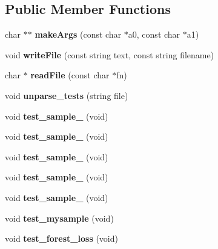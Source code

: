 \subsection*{Public Member Functions}
\begin{DoxyCompactItemize}
\item 
\hypertarget{classAstTestSuite_a2f0462e7a965acda10e09e70432cab40}{char $\ast$$\ast$ {\bfseries make\-Args} (const char $\ast$a0, const char $\ast$a1)}\label{classAstTestSuite_a2f0462e7a965acda10e09e70432cab40}

\item 
\hypertarget{classAstTestSuite_ab935b3c95647b24b5f250b7e3332a313}{void {\bfseries write\-File} (const string text, const string filename)}\label{classAstTestSuite_ab935b3c95647b24b5f250b7e3332a313}

\item 
\hypertarget{classAstTestSuite_afb1462e2494b011f0e5077a567e0ba3d}{char $\ast$ {\bfseries read\-File} (const char $\ast$fn)}\label{classAstTestSuite_afb1462e2494b011f0e5077a567e0ba3d}

\item 
\hypertarget{classAstTestSuite_a1fb6dcbf82548632381eb89079b456aa}{void {\bfseries unparse\-\_\-tests} (string file)}\label{classAstTestSuite_a1fb6dcbf82548632381eb89079b456aa}

\item 
\hypertarget{classAstTestSuite_ade48304a65cbc7449bd22ec9097b6a8c}{void {\bfseries test\-\_\-sample\-\_} (void)}\label{classAstTestSuite_ade48304a65cbc7449bd22ec9097b6a8c}

\item 
\hypertarget{classAstTestSuite_af764267aa9a94610fd5307ae81107312}{void {\bfseries test\-\_\-sample\-\_} (void)}\label{classAstTestSuite_af764267aa9a94610fd5307ae81107312}

\item 
\hypertarget{classAstTestSuite_a956750fe55d2eb218eb75bd7dc75bc34}{void {\bfseries test\-\_\-sample\-\_} (void)}\label{classAstTestSuite_a956750fe55d2eb218eb75bd7dc75bc34}

\item 
\hypertarget{classAstTestSuite_a665836b3d23c82eda3233a3c5d2f0ba4}{void {\bfseries test\-\_\-sample\-\_} (void)}\label{classAstTestSuite_a665836b3d23c82eda3233a3c5d2f0ba4}

\item 
\hypertarget{classAstTestSuite_a9cceb7f0e5a6714d539f25db38424851}{void {\bfseries test\-\_\-sample\-\_} (void)}\label{classAstTestSuite_a9cceb7f0e5a6714d539f25db38424851}

\item 
\hypertarget{classAstTestSuite_adbc7de61740aaf9ebf9b7e25f024f318}{void {\bfseries test\-\_\-mysample} (void)}\label{classAstTestSuite_adbc7de61740aaf9ebf9b7e25f024f318}

\item 
\hypertarget{classAstTestSuite_ade9231acfe5f8c8f02e00e54749cf99b}{void {\bfseries test\-\_\-forest\-\_\-loss} (void)}\label{classAstTestSuite_ade9231acfe5f8c8f02e00e54749cf99b}

\end{DoxyCompactItemize}
